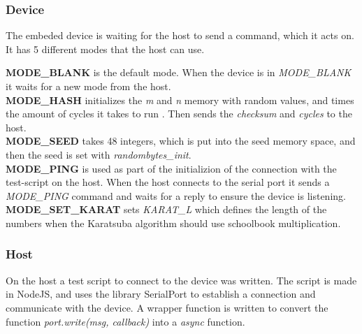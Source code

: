 \subsubsection{Device}
The embeded device is waiting for the host to send a command, which it acts on. It has 5 different modes that the host can use. 


\textbf{MODE\_BLANK} is the default mode. When the device is in \textit{MODE\_BLANK} it waits for a new mode from the host.\\

\textbf{MODE\_HASH} initializes the \textit{m} and \textit{n} memory with random values, and times the amount of cycles it takes to run . Then sends the \textit{checksum} and \textit{cycles} to the host.\\ 


\textbf{MODE\_SEED} takes 48 integers, which is put into the seed memory space, and then the seed is set with \textit{randombytes\_init}.\\


\textbf{MODE\_PING} is used as part of the initializion of the connection with the test-script on the host. When the host connects to the serial port it sends a \textit{MODE\_PING} command and waits for a reply to ensure the device is listening.\\


\textbf{MODE\_SET\_KARAT} sets \textit{KARAT\_L} which defines the length of the numbers when the Karatsuba algorithm should use schoolbook multiplication.\\


\subsubsection{Host}
On the host a test script to connect to the device was written. The script is made in NodeJS\cite{nodejs}, and uses the library SerialPort\cite{serialport} to establish a connection and communicate with the device.
A wrapper function is written to convert the function \textit{port.write(msg, callback)} into a \textit{async} function. 


